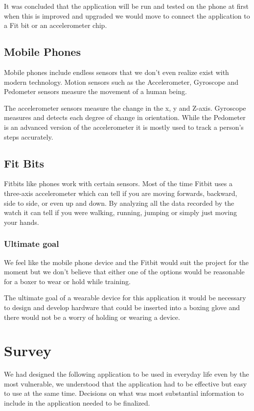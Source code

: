 \documentclass[a4paper,12pt]{report}
\begin{document}
It was concluded that the application will be run and tested on the phone at first when this is improved and upgraded we would move to connect the application to a Fit bit or an accelerometer chip.

\subsection{Mobile Phones}
Mobile phones include endless sensors that we don't even realize exist with modern technology.
Motion sensors such as the Accelerometer, Gyroscope and Pedometer sensors measure the movement of a human being.

The accelerometer sensors measure the change in the x, y and Z-axis. Gyroscope measures and detects each degree of change in orientation. While the Pedometer is an advanced version of the accelerometer it is mostly used to track a person's steps accurately.\cite{sensorsPhone}   

\subsection{Fit Bits}
Fitbits like phones work with certain sensors. Most of the time Fitbit uses a three-axis accelerometer which can tell if you are moving forwards, backward, side to side, or even up and down.
By analyzing all the data recorded by the watch it can tell if you were walking, running, jumping or simply just moving your hands.\cite{sensorsFitbit}

\subsubsection{Ultimate goal}
We feel like the mobile phone device and the Fitbit would suit the project for the moment but we don't believe that either one of the options would be reasonable for a boxer to wear or hold while training.

The ultimate goal of a wearable device for this application it would be necessary to design and develop hardware that could be inserted into a boxing glove and there would not be a worry of holding or wearing a device.

\section{Survey}
\vspace{5mm} %

We had designed the following application to be used in everyday life even by the most vulnerable, we understood that the application had to be effective but easy to use at the same time. Decisions on what was most substantial information to include in the application needed to be finalized.
\end{document}
